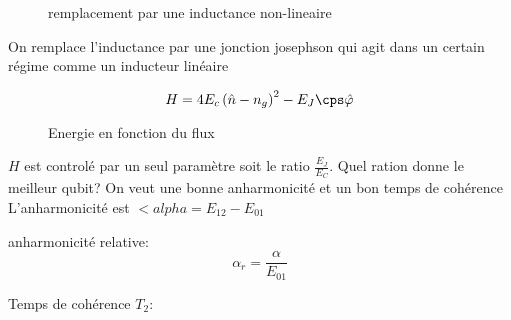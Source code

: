 \begin{figure}[ht]
    \centering
    \caption{remplacement par une inductance non-lineaire}
    \label{fig:remplacement-par-une-inductance-non-lineaire}
\end{figure}

On remplace l'inductance par une jonction josephson qui agit dans un certain régime comme un inducteur linéaire


\[ H = 4 E_c \left( \hat n - n_g \right)^2 - E_J \cps \hat \varphi \]


\begin{figure}[ht]
    \centering
    \caption{Energie en fonction du flux}
    \label{fig:energie-en-fonction-du-flux}
\end{figure}



$H$ est controlé par un seul paramètre soit le ratio $\frac{E_J}{E_C} $. Quel ration donne le meilleur qubit? On veut une bonne anharmonicité et un bon temps de cohérence
L'anharmonicité est $<alpha = E_{12} - E_{01} $

anharmonicité relative: \[ \alpha_r = \frac{\alpha}{E_{01} }  \]


Temps de cohérence $T_2$:










